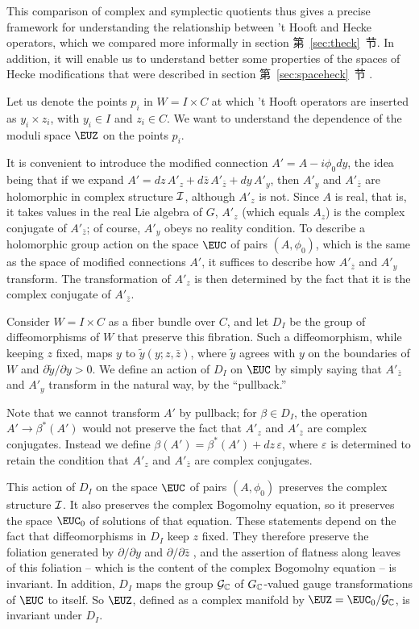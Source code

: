 This comparison of complex and symplectic quotients thus gives a
precise framework for understanding the relationship between 't
Hooft and Hecke operators, which we compared more informally in
section 第~\ref{sec:theck}~节.  In addition, it will enable us to understand
better some properties of the spaces of Hecke modifications that
were described in section 第~\ref{sec:spaceheck}~节 .

\par{}

Let us denote the points $p_i$ in $W=I\times C$ at which 't Hooft
operators are inserted as $y_i\times z_i$, with $y_i\in I$ and
$z_i\in C$.  We want to understand the dependence of the moduli
space ${\EUZ}$ on the points $p_i$.

It is convenient to introduce the modified connection
$A'=A-i\phi_0 dy$, the idea being that if we expand
$A'=dz\,A'_z+d\bar z \,A'_{\bar z} +dy\, A'_y$, then $A'{}_y$ and
$A'{}_{\bar z}$ are holomorphic in complex structure ${\cal I}$,
although $A'_z$ is not.  Since $A$ is real,  that is, it takes
values in the real Lie algebra of $G$, $A'_z$ (which equals $A_z$)
is the complex conjugate of $A'_{\bar z}$; of course, $A'_y$ obeys
no reality condition. To describe a holomorphic group action on
the space $\EUC$ of pairs $(A,\phi_0)$, which is the same as the
space of modified connections $A'$, it suffices to describe how
$A'_{\bar z}$ and $A'_y$ transform.  The transformation of $A'_z$
is then determined by the fact that it is the complex conjugate of
$A'_{\bar z}$.

 Consider
$W=I\times C$ as a fiber bundle over $C$, and let $D_I$ be the
group of  diffeomorphisms of $W$ that preserve this fibration.
Such a diffeomorphism, while keeping $z$ fixed, maps $y$ to
$\tilde y(y;z,\bar z)$, where $\tilde y$ agrees with $y$ on the
boundaries of $W$ and $\partial \tilde y/\partial y>0$.  We define
an action of $D_I$ on $\EUC$  by simply saying that $A'_{\bar z}$
and $A'_y$ transform in the natural way, by the ``pullback.''

Note that we cannot transform $A'$ by pullback; for $\beta\in
D_I$, the operation $A'\to \beta^*(A')$ would not preserve the
fact that $A'_z$ and $A'_{\bar z}$ are complex conjugates. Instead
we define $\beta(A')=\beta^*(A')+dz\,\varepsilon$, where
$\varepsilon$ is determined to retain the condition that $A'_z$
and $A'_{\bar z}$ are complex conjugates.

This action of $D_I$ on the space $\EUC$ of pairs $(A,\phi_0)$
preserves the complex structure ${\cal I}$.  It also preserves the
complex Bogomolny equation,  so it preserves the space ${\EUC}_0$
of solutions of that equation.  These statements depend on the
fact that diffeomorphisms in $D_I$ keep $z$ fixed. They therefore
preserve the foliation generated by $\partial/\partial y$ and
$\partial/\partial \bar z$ , and the assertion of flatness along
leaves of this foliation -- which is the content of the complex
Bogomolny equation -- is invariant. In addition, $D_I$ maps the
group ${\cal G}_{\Bbb{C}}$ of $G_{\Bbb{C}}$-valued gauge
transformations of $\EUC$  to itself. So ${\EUZ}$, defined as a
complex manifold by ${\EUZ}={\EUC}_0/{\cal G}_{\Bbb{C}}$, is
invariant under $D_I$.

